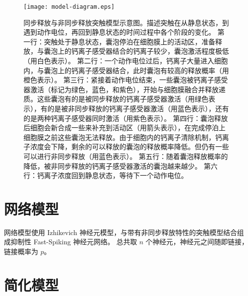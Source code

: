 \begin{figure}[h]
\centering
\texttt{[image: model-diagram.eps]}
\caption{同步释放与非同步释放突触模型示意图。描述突触在从静息状态，到遇到动作电位，再回到静息状态的时间过程中各个阶段的变化。
第一行：突触处于静息状态，囊泡停泊在细胞膜上的活动区，准备释放，与囊泡上的钙离子感受器结合的钙离子较少，囊泡激活程度极低（用白色表示）。
第二行：一个动作电位过后，钙离子大量进入细胞内，与囊泡上的钙离子感受器结合，此时囊泡有较高的释放概率（用橙色表示）。
第三行：紧接着动作电位结束，一些囊泡被钙离子感受器激活（标记为绿色，蓝色，和紫色），开始与细胞膜融合并释放递质。这些囊泡有的是被同步释放的钙离子感受器激活（用绿色表示），有的是被非同步释放的钙离子感受器激活（用蓝色表示），还有的是两种钙离子感受器同时激活（用紫色表示）。
第四行：囊泡释放后细胞会新合成一些来补充到活动区（用箭头表示），在完成停泊上细胞膜之前这些囊泡无法释放。由于细胞内的钙离子清除机制，钙离子浓度会下降，剩余的可以释放的囊泡的释放概率降低。但仍有一些可以进行非同步释放（用蓝色表示）。
第五行：随着囊泡释放概率的降低，被非同步释放的钙离子感受器激活的囊泡越来越少。
第六行：钙离子浓度回到静息状态，等待下一个动作电位。}
\label{figure:model-diagram}
\end{figure}

\section{网络模型}
\label{section:model:network-model}
网络模型使用 Izhikevich 神经元模型，与带有非同步释放特性的突触模型结合组成抑制性 Fast-Spiking 神经元网络。
总共取 $n$ 个神经元，神经元之间随即链接，链接概率为 $p$。

\section{简化模型}
\label{section:model:simplified-model}
